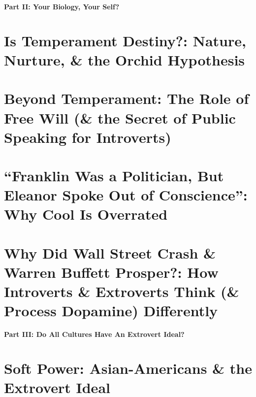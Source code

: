 \documentclass{article}
\numberwithin{equation}{section}
\begin{document}

\begin{center}\LARGE\sf
	\textbf{Part II: Your Biology, Your Self?}
\end{center}

\section{Is Temperament Destiny?: Nature, Nurture, \& the Orchid Hypothesis}


\section{Beyond Temperament: The Role of Free Will (\& the Secret of Public Speaking for Introverts)}


\section{``Franklin Was a Politician, But Eleanor Spoke Out of Conscience'': Why Cool Is Overrated}


\section{Why Did Wall Street Crash \& Warren Buffett Prosper?: How Introverts \& Extroverts Think (\& Process Dopamine) Differently}


\begin{center}\LARGE\sf
	\textbf{Part III: Do All Cultures Have An Extrovert Ideal?}
\end{center}

\section{Soft Power: Asian-Americans \& the Extrovert Ideal}

\end{document}
